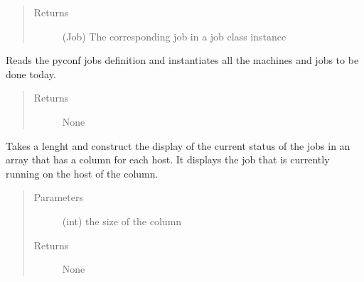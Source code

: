 \documentclass[a4paper,10pt,english]{sphinxmanual}
\begin{document}
\begin{fulllineitems}
\begin{fulllineitems}
\begin{quote}
\begin{description}
\item[{Returns}] \leavevmode
(Job) The corresponding job in a job class instance

\end{description}\end{quote}

\end{fulllineitems}


\begin{fulllineitems}
\label{\detokenize{apidoc_commands/commands:commands.jobs.Jobs.determine_jobs_and_machines}}
Reads the pyconf jobs definition and instantiates all
the machines and jobs to be done today.
\begin{quote}\begin{description}
\item[{Returns}] \leavevmode
None

\end{description}\end{quote}

\end{fulllineitems}


\begin{fulllineitems}
\label{\detokenize{apidoc_commands/commands:commands.jobs.Jobs.display_status}}
Takes a lenght and construct the display of the current status 
of the jobs in an array that has a column for each host.
It displays the job that is currently running on the host of the column.
\begin{quote}\begin{description}
\item[{Parameters}] \leavevmode
{} \textendash{} (int) the size of the column

\item[{Returns}] \leavevmode
None

\end{description}\end{quote}

\end{fulllineitems}



\end{fulllineitems}
\end{document}
